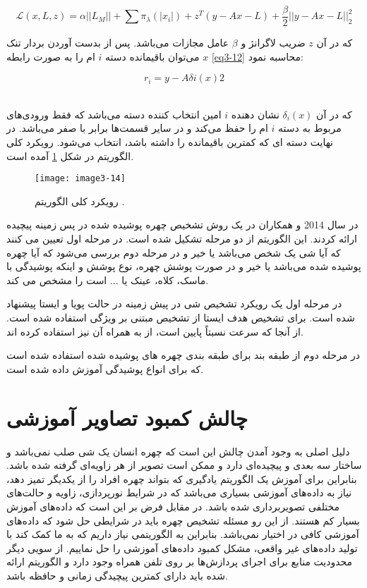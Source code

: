 \begin{equation}
\label{eq3-11}
\mathcal{L}(x,L,z) = \alpha ||L_M|| + \sum \pi_\lambda ( |x_i|) + z^T (y - Ax - L) + \frac{\beta}{2} ||y - Ax - L||_2^2
\end{equation}

\noindent‏
که در آن $z$ ضریب لاگرانژ و $\beta$ عامل مجازات می‌باشد. پس از بدست آوردن بردار تنک $x$ می‌توان باقیمانده دسته $i$ ام را به صورت رابطه \ref{eq3-12} محاسبه نمود:

\begin{equation}
\label{eq3-12}
r_i=y-Aδi(x)2
\end{equation}‏

\noindent‏
که در آن $\delta_i(x)$ نشان دهنده $i$ امین انتخاب کننده دسته می‌باشد که فقط ورودی‌های مربوط به دسته $i$ ام را حفظ می‌کند و در سایر قسمت‌ها برابر با صفر می‌باشد. در نهایت دسته ای که کمترین باقیمانده را داشته باشد، انتخاب می‌شود. رویکرد کلی الگوریتم در شکل \ref{image3-14} آمده است.

\begin{figure}[h]
\centering
  \texttt{[image: image3-14]}
  \caption{رویکرد کلی الگوریتم  \cite{WU2018256}.}
  \label{image3-14}
\end{figure}

\noindent
در سال 2014  و همکاران در \cite{7015448} یک روش تشخیص چهره پوشیده شده در پس زمینه پیچیده ارائه کردند. این الگوریتم از دو مرحله تشکیل شده است. در مرحله اول تعیین می کنند که آیا شی یک شخص می‌باشد یا خیر و در مرحله دوم بررسی می‌شود که آیا چهره پوشیده شده می‌باشد یا خیر و در صورت پوشش چهره، نوع پوشش و اینکه پوشیدگی با ماسک، کلاه، عینک یا ... است را مشخص می کند.

\noindent
در مرحله اول یک رویکرد تشخیص شی در پیش زمینه در حالت پویا و ایستا پیشنهاد شده است. برای تشخیص هدف ایستا از تشخیص مبتنی بر ویژگی  استفاده شده است. از آنجا که سرعت  نسبتاً پایین است، از  به همراه آن نیز استفاده کرده اند. 

\noindent
در مرحله دوم از طبقه بند  برای طبقه بندی چهره های پوشیده شده استفاده شده است که برای انواع پوشیدگی آموزش داده شده است.

\section{چالش کمبود تصاویر آموزشی}
دلیل اصلی به وجود آمدن چالش‌ این است که چهره انسان یک شی صلب نمی‌باشد و ساختار سه بعدی و پیچیده‌ای دارد و ممکن است تصویر از هر زاویه‌ای گرفته شده باشد. بنابراین برای آموزش یک الگوریتم یادگیری که بتواند چهره افراد را از یکدیگر تمیز دهد، نیاز به داده‌های آموزشی بسیاری می‌باشد که در شرایط نورپردازی، زاویه و حالت‌های مختلفی تصویربرداری شده باشد. در مقابل فرض بر این است که داده‌های آموزش بسیار کم هستند. از این رو مسئله تشخیص چهره باید در شرایطی حل شود که داده‌های آموزشی کافی در اختیار نمی‌باشد. بنابراین به الگوریتمی نیاز داریم که به ما کمک کند با تولید داده‌های غیر واقعی، مشکل کمبود داده‌های آموزشی را حل نماییم. از سویی دیگر محدودیت‌ منابع برای اجرای پردازش‌ها بر روی تلفن همراه وجود دارد و الگوریتم ارائه شده باید دارای کمترین پیچیدگی زمانی و حافظه باشد.

